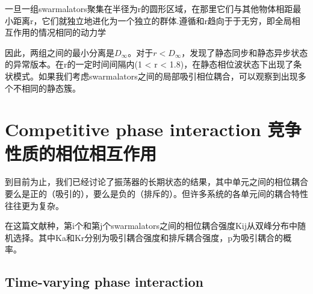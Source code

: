\documentclass[12pt, oneside]{ctexbook}
\begin{document}
一旦一组swarmalators聚集在半径为r的圆形区域，在那里它们与其他物体相距最小距离r，它们就独立地进化为一个独立的群体.遵循和r趋向于于无穷，即全局相互作用的情况相同的动力学

因此，两组之间的最小分离是$D_\infty$。对于$r<D_\infty$，发现了静态同步和静态异步状态的异常版本。在r的一定时间间隔内(1 < r < 1.8)，在静态相位波状态下出现了条状模式。如果我们考虑swarmalators之间的局部吸引相位耦合，可以观察到出现多个不相同的静态簇。

\section{Competitive phase interaction 竞争性质的相位相互作用}

到目前为止，我们已经讨论了振荡器的长期状态的结果，其中单元之间的相位耦合要么是正的（吸引的），要么是负的（排斥的）。但许多系统的各单元间的耦合特性往往更为复杂。

在这篇文献种，第i个和第j个swarmalators之间的相位耦合强度Kij从双峰分布中随机选择。其中Ka和Kr分别为吸引耦合强度和排斥耦合强度，p为吸引耦合的概率。

\subsection{Time-varying phase interaction}
\end{document}

